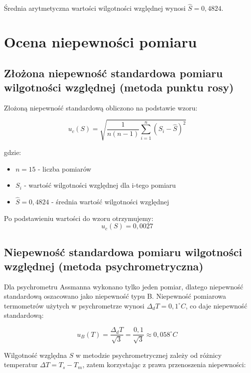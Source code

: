 \documentclass[a4paper,12pt]{article}
\begin{document}
Średnia arytmetyczna wartości wilgotności względnej wynosi $\hat{S} = 0{,}4824$.

\section{Ocena niepewności pomiaru}

\subsection{Złożona niepewność standardowa pomiaru wilgotności względnej (metoda punktu rosy)}

Złożoną niepewność standardową obliczono na podstawie wzoru:

\begin{equation}
    u_c(S) = \sqrt{\frac{1}{n(n-1)} \sum_{i=1}^{n} (S_i - \hat{S})^2}
\end{equation}

gdzie:
\begin{itemize}
    \item $n = 15$ - liczba pomiarów
    \item $S_i$ - wartość wilgotności względnej dla i-tego pomiaru
    \item $\hat{S} = 0{,}4824$ - średnia wartość wilgotności względnej
\end{itemize}

Po podstawieniu wartości do wzoru otrzymujemy:
\begin{equation}
    u_c(S) = 0{,}0027
\end{equation}

\subsection{Niepewność standardowa pomiaru wilgotności względnej (metoda psychrometryczna)}

Dla psychrometru Assmanna wykonano tylko jeden pomiar, dlatego niepewność standardową oszacowano jako niepewność typu B. Niepewność pomiarowa termometrów użytych w psychrometrze wynosi $\Delta_d T = 0{,}1^\circ C$, co daje niepewność standardową:

\begin{equation}
    u_B(T) = \frac{\Delta_d T}{\sqrt{3}} = \frac{0{,}1}{\sqrt{3}} \approx 0{,}058^\circ C
\end{equation}

Wilgotność względna $S$ w metodzie psychrometrycznej zależy od różnicy temperatur $\Delta T = T_s - T_m$, zatem korzystając z prawa przenoszenia niepewności:
\end{document}
